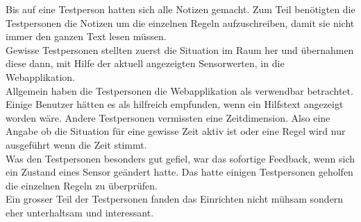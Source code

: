 Bis auf eine Testperson hatten sich alle Notizen gemacht. Zum Teil benötigten die Testpersonen die Notizen um die einzelnen Regeln aufzuschreiben, damit sie nicht immer den ganzen Text lesen müssen.\\
Gewisse Testpersonen stellten zuerst die Situation im Raum her und übernahmen diese dann, mit Hilfe der aktuell angezeigten Sensorwerten, in die Webapplikation.\\[2ex]
%
Allgemein haben die Testpersonen die Webapplikation als verwendbar betrachtet. Einige Benutzer hätten es als hilfreich empfunden, wenn ein Hilfstext angezeigt worden wäre. Andere Testpersonen vermissten eine Zeitdimension. Also eine Angabe ob die Situation für eine gewisse Zeit aktiv ist oder eine Regel wird nur ausgeführt wenn die Zeit stimmt.\\
Was den Testpersonen besonders gut gefiel, war das sofortige Feedback, wenn sich ein Zustand eines Sensor geändert hatte. Das hatte einigen Testpersonen geholfen die einzelnen Regeln zu überprüfen.\\
Ein grosser Teil der Testpersonen fanden das Einrichten nicht mühsam sondern eher unterhaltsam und interessant.
%
